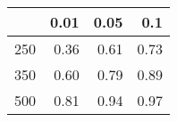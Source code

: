 % 
\begin{tabular}{rrrr}
  \hline
 & 0.01 & 0.05 & 0.1 \\ 
  \hline
250 & 0.36 & 0.61 & 0.73 \\ 
  350 & 0.60 & 0.79 & 0.89 \\ 
  500 & 0.81 & 0.94 & 0.97 \\ 
   \hline
\end{tabular}
